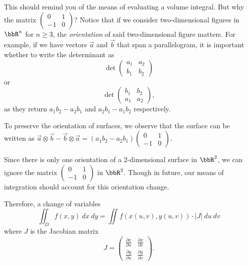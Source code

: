 \documentclass[a4paper, 12pt,oneside,openany]{book}
\begin{document}
This should remind you of the means of evaluating a volume integral. But why the matrix $\begin{pmatrix} 0 & 1 \\ -1 & 0 \end{pmatrix}$? Notice that if we consider two-dimensional figures in $\bbR^n$ for $n\geq 3$, the \emph{orientation} of said two-dimensional figure matters. For example, if we have vectors $\vec{a}$ and $\vec{b}$ that span a parallelogram, it is important whether to write the determinant as $$\det\begin{pmatrix} a_1 & a_2 \\ b_1 & b_2 \end{pmatrix}$$ or $$\det\begin{pmatrix} b_1 & b_2 \\ a_1 & a_2 \end{pmatrix},$$ as they return $a_1b_2-a_2b_1$ and $a_2b_1-a_1b_2$ respectively.

To preserve the orientation of surfaces, we observe that the surface can be written as $\vec{a} \otimes \vec{b} - \vec{b} \otimes \vec{a} = (a_1b_2-a_2b_1) \begin{pmatrix} 0&1 \\-1&0 \end{pmatrix}.$

Since there is only one orientation of a 2-dimensional surface in $\bbR^2$, we can ignore the matrix $ \begin{pmatrix} 0&1 \\-1&0 \end{pmatrix}$ in $\bbR^2$. Though in future, our means of integration should account for this orientation change.

Therefore, a change of variables $$\iint_D f(x, y) \ dx\ dy = \iint f(x(u, v), y(u, v)) \cdot |J|\ du\ dv$$ where $J$ is the Jacobian matrix $$J= \begin{pmatrix}\frac{\partial x}{\partial u} & \frac{\partial x}{\partial v} \\ \frac{\partial y}{\partial u} & \frac{\partial y}{\partial v} \end{pmatrix}.$$

\end{document}
